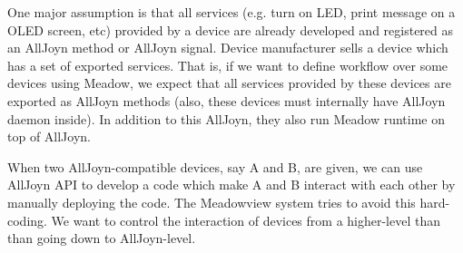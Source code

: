 \documentclass{note}
\begin{document}
One major assumption is that all services (e.g. turn on LED, print
   message on a OLED screen, etc) provided by a device  are already
   developed and registered as an AllJoyn method or AllJoyn signal.
   Device manufacturer sells a device which has a set of exported services.
     That is, if we want to define workflow over some devices using Meadow, we
     expect that all services provided by these devices are exported as
     AllJoyn methods (also, these devices must internally have AllJoyn daemon
     inside). In addition to this AllJoyn, they also run Meadow runtime on top
     of AllJoyn.   


When two AllJoyn-compatible devices, say A and B, are given, we can use AllJoyn API to
develop a code which make A and B interact with each other by manually
deploying the code. The Meadowview system tries to avoid this hard-coding. We
want to control the interaction of devices from a higher-level than than going
down to AllJoyn-level. 
\end{document}
